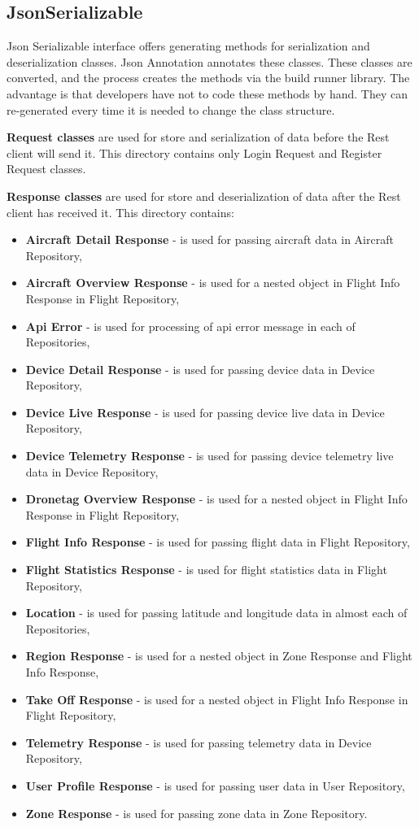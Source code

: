 \subsection{JsonSerializable}\label{subsec:jsonserializable-classes}
Json Serializable interface offers generating methods for serialization and deserialization classes.
Json Annotation annotates these classes.
These classes are converted, and the process creates the methods via the build runner library.
The advantage is that developers have not to code these methods by hand.
They can re-generated every time it is needed to change the class structure.

\textbf{Request classes} are used for store and serialization of data before the Rest client will send it.
This directory contains only Login Request and Register Request classes.

\textbf{Response classes} are used for store and deserialization of data after the Rest client has received it.
This directory contains:
\begin{itemize}
    \item \textbf{Aircraft Detail Response} - is used for passing aircraft data in Aircraft Repository,
    \item \textbf{Aircraft Overview Response} - is used for a nested object in Flight Info Response in Flight Repository,
    \item \textbf{Api Error} - is used for processing of \acrshort{api} error message in each of Repositories,
    \item \textbf{Device Detail Response} - is used for passing device data in Device Repository,
    \item \textbf{Device Live Response} - is used for passing device live data in Device Repository,
    \item \textbf{Device Telemetry Response} - is used for passing device telemetry live data in Device Repository,
    \item \textbf{Dronetag Overview Response} - is used for a nested object in Flight Info Response in Flight Repository,
    \item \textbf{Flight Info Response} - is used for passing flight data in Flight Repository,
    \item \textbf{Flight Statistics Response} - is used for flight statistics data in Flight Repository,
    \item \textbf{Location} - is used for passing latitude and longitude data in almost each of Repositories,
    \item \textbf{Region Response} - is used for a nested object in Zone Response and Flight Info Response,
    \item \textbf{Take Off Response} - is used for a nested object in Flight Info Response in Flight Repository,
    \item \textbf{Telemetry Response} - is used for passing telemetry data in Device Repository,
    \item \textbf{User Profile Response} - is used for passing user data in User Repository,
    \item \textbf{Zone Response} - is used for passing zone data in Zone Repository.
\end{itemize}
